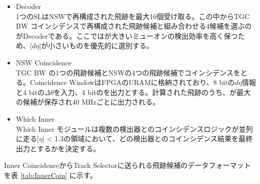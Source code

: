 \begin{itemize}
    \item Decoder\\
    1つのSLはNSWで再構成された飛跡を最大16個受け取る。この中からTGC BW コインシデンスで再構成された飛跡候補と組み合わせる4候補を選ぶのがDecoderである。ここでは\pt が大きいミューオンの検出効率を高く保つため、|$d\eta$|が小さいものを優先的に選別する。
    \item NSW Coincidence\\
    TGC BW の1つの飛跡候補とNSWの4つの飛跡候補でコインシデンスをとる。Coincidence WindowはFPGAのURAMに格納されており、8 bitの$d\eta$情報と4 bitの$\Delta\theta$を入力、4 bitの\pt を出力とする。計算された飛跡のうち、\pt が最大の候補が保存され40 MHzごとに出力される。
    \item Which Inner\\
    Which Inner モジュールは複数の検出器とのコインシデンスロジックが並列に走る|$\eta$| < 1.3の領域において、どの検出器とのコインシデンス結果を最終出力とするかを決定する。
\end{itemize}

Inner CoincidenceからTrack Selectorに送られる飛跡候補のデータフォーマットを表 \ref{tab:InnerCoin} に示す。

